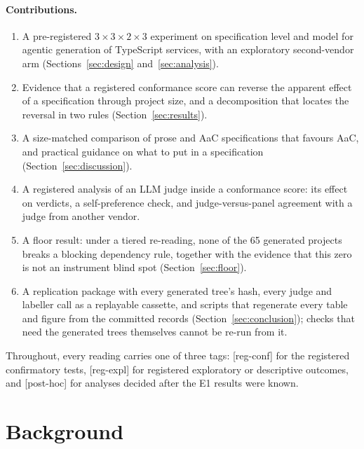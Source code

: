 \documentclass[10pt,a4paper]{article}
\newcommand{\regC}{\textsf{\scriptsize[reg-conf]}}  %
\newcommand{\regX}{\textsf{\scriptsize[reg-expl]}}  %
\newcommand{\ph}{\textsf{\scriptsize[post-hoc]}}    %
\begin{document}
\paragraph{Contributions.}
\begin{enumerate}
  \item A pre-registered $3 \times 3 \times 2 \times 3$ experiment on specification level and model for agentic
        generation of TypeScript services, with an exploratory second-vendor arm (Sections~\ref{sec:design}
        and~\ref{sec:analysis}).
  \item Evidence that a registered conformance score can reverse the apparent effect of a specification through
        project size, and a decomposition that locates the reversal in two rules (Section~\ref{sec:results}).
  \item A size-matched comparison of prose and AaC specifications that favours AaC, and practical guidance on what to
        put in a specification (Section~\ref{sec:discussion}).
  \item A registered analysis of an LLM judge inside a conformance score: its effect on verdicts, a self-preference
        check, and judge-versus-panel agreement with a judge from another vendor.
  \item A floor result: under a tiered re-reading, none of the 65 generated projects breaks a blocking
        dependency rule, together with the evidence that this zero is not an instrument blind spot
        (Section~\ref{sec:floor}).
  \item A replication package with every generated tree's hash, every judge and labeller call as a replayable
        cassette, and scripts that regenerate every table and figure from the committed records
        (Section~\ref{sec:conclusion}); checks that need the generated trees themselves cannot be re-run from it.
\end{enumerate}

Throughout, every reading carries one of three tags: \regC{} for the registered confirmatory tests, \regX{} for
registered exploratory or descriptive outcomes, and \ph{} for analyses decided after the E1 results were known.

\section{Background}\label{sec:background}
\end{document}
